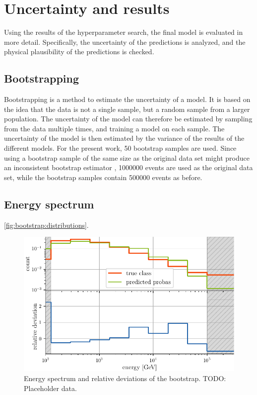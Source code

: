 \section{Uncertainty and results}
Using the results of the hyperparameter search,
the final model is evaluated in more detail.
Specifically,
  the uncertainty of the predictions is analyzed, %
  and the physical plausibility of the predictions is checked.


\subsection{Bootstrapping}
Bootstrapping \cite{bootstrap} is a method to estimate the uncertainty of a model.
It is based on the idea that the data is not a single sample,
but a random sample from a larger population.
The uncertainty of the model can therefore be estimated by sampling from the data multiple times,
and training a model on each sample.
The uncertainty of the model is then estimated by the variance of the results of the different models.
%
For the present work, \num{50} bootstrap samples are used. %
Since using a bootstrap sample of the same size as the original data set
might produce an inconsistent bootstrap estimator \cite{bootstrap_samplesize},
\num{1000000} events are used as the original data set,
while the bootstrap samples contain \num{500000} events as before.


\subsection{Energy spectrum}
\autoref{fig:bootstrap:distributions}.

\blindtext[2]

\begin{figure}
  \centering
  \includegraphics[scale=1]{content/plots/bootstrap:spectrum.pdf}
  \caption{
    Energy spectrum and relative deviations of the bootstrap.
    TODO: Placeholder data.
  }
  \label{fig:bootstrap:spectrum}
\end{figure}


